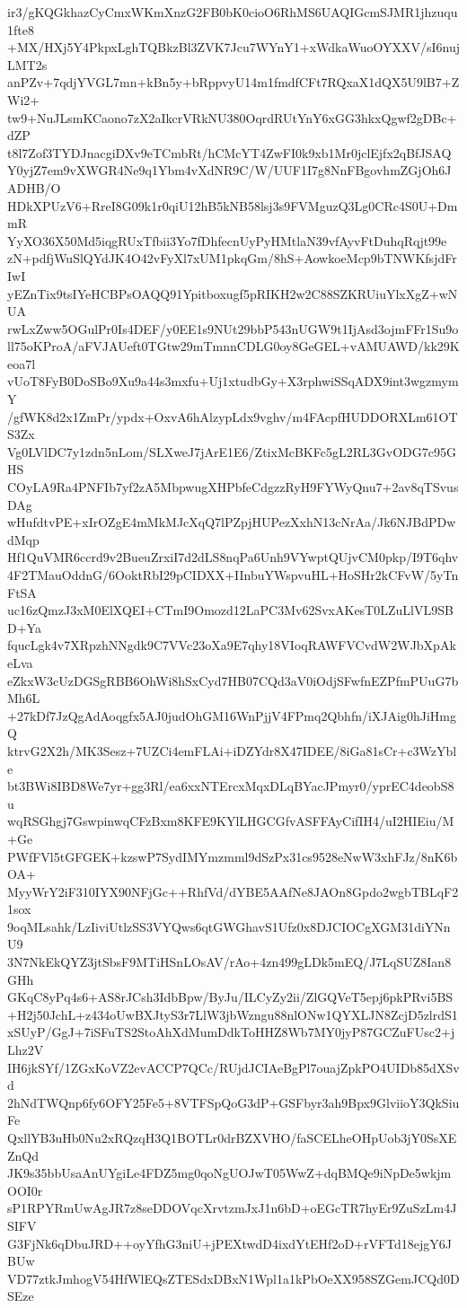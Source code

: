 ir3/gKQGkhazCyCmxWKmXnzG2FB0bK0cioO6RhMS6UAQIGcmSJMR1jhzuqu1fte8
+MX/HXj5Y4PkpxLghTQBkzBl3ZVK7Jcu7WYnY1+xWdkaWuoOYXXV/sI6nujLMT2s
anPZv+7qdjYVGL7mn+kBn5y+bRppvyU14m1fmdfCFt7RQxaX1dQX5U9lB7+ZWi2+
tw9+NuJLsmKCaono7zX2aIkcrVRkNU380OqrdRUtYnY6xGG3hkxQgwf2gDBc+dZP
t8l7Zof3TYDJnacgiDXv9eTCmbRt/hCMcYT4ZwFI0k9xb1Mr0jclEjfx2qBfJSAQ
Y0yjZ7em9vXWGR4Ne9q1Ybm4vXdNR9C/W/UUF1I7g8NnFBgovhmZGjOh6JADHB/O
HDkXPUzV6+RreI8G09k1r0qiU12hB5kNB58lsj3s9FVMguzQ3Lg0CRc4S0U+DmmR
YyXO36X50Md5iqgRUxTfbii3Yo7fDhfecnUyPyHMtlaN39vfAyvFtDuhqRqjt99e
zN+pdfjWuSlQYdJK4O42vFyXl7xUM1pkqGm/8hS+AowkoeMcp9bTNWKfsjdFrIwI
yEZnTix9tsIYeHCBPsOAQQ91Ypitboxugf5pRIKH2w2C88SZKRUiuYlxXgZ+wNUA
rwLxZww5OGulPr0Is4DEF/y0EE1s9NUt29bbP543nUGW9t1IjAsd3ojmFFr1Su9o
ll75oKProA/aFVJAUeft0TGtw29mTmnnCDLG0oy8GeGEL+vAMUAWD/kk29Keoa7l
vUoT8FyB0DoSBo9Xu9a44s3mxfu+Uj1xtudbGy+X3rphwiSSqADX9int3wgzmymY
/gfWK8d2x1ZmPr/ypdx+OxvA6hAlzypLdx9vghv/m4FAcpfHUDDORXLm61OTS3Zx
Vg0LVlDC7y1zdn5nLom/SLXweJ7jArE1E6/ZtixMcBKFc5gL2RL3GvODG7c95GHS
COyLA9Ra4PNFIb7yf2zA5MbpwugXHPbfeCdgzzRyH9FYWyQnu7+2av8qTSvusDAg
wHufdtvPE+xIrOZgE4mMkMJcXqQ7lPZpjHUPezXxhN13cNrAa/Jk6NJBdPDwdMqp
Hf1QuVMR6ccrd9v2BueuZrxiI7d2dLS8nqPa6Unh9VYwptQUjvCM0pkp/I9T6qhv
4F2TMauOddnG/6OoktRbI29pCIDXX+IInbuYWspvuHL+HoSHr2kCFvW/5yTnFtSA
uc16zQmzJ3xM0ElXQEI+CTmI9Omozd12LaPC3Mv62SvxAKesT0LZuLlVL9SBD+Ya
fqucLgk4v7XRpzhNNgdk9C7VVc23oXa9E7qhy18VIoqRAWFVCvdW2WJbXpAkeLva
eZkxW3cUzDGSgRBB6OhWi8hSxCyd7HB07CQd3aV0iOdjSFwfnEZPfmPUuG7bMh6L
+27kDf7JzQgAdAoqgfx5AJ0judOhGM16WnPjjV4FPmq2Qbhfn/iXJAig0hJiHmgQ
ktrvG2X2h/MK3Sesz+7UZCi4emFLAi+iDZYdr8X47IDEE/8iGa81sCr+c3WzYble
bt3BWi8IBD8We7yr+gg3Rl/ea6xxNTErcxMqxDLqBYacJPmyr0/yprEC4deobS8u
wqRSGhgj7GswpinwqCFzBxm8KFE9KYlLHGCGfvASFFAyCifIH4/uI2HIEiu/M+Ge
PWfFVl5tGFGEK+kzswP7SydIMYmzmml9dSzPx31cs9528eNwW3xhFJz/8nK6bOA+
MyyWrY2iF310IYX90NFjGc++RhfVd/dYBE5AAfNe8JAOn8Gpdo2wgbTBLqF21sox
9oqMLsahk/LzIiviUtlzSS3VYQws6qtGWGhavS1Ufz0x8DJCIOCgXGM31diYNnU9
3N7NkEkQYZ3jtSbsF9MTiHSnLOsAV/rAo+4zn499gLDk5mEQ/J7LqSUZ8Ian8GHh
GKqC8yPq4s6+AS8rJCsh3IdbBpw/ByJu/ILCyZy2ii/ZlGQVeT5epj6pkPRvi5BS
+H2j50JchL+z434oUwBXJtyS3r7LlW3jbWzngu88nlONw1QYXLJN8ZcjD5zlrdS1
xSUyP/GgJ+7iSFuTS2StoAhXdMumDdkToHHZ8Wb7MY0jyP87GCZuFUsc2+jLhz2V
IH6jkSYf/1ZGxKoVZ2evACCP7QCc/RUjdJCIAeBgPl7ouajZpkPO4UIDb85dXSvd
2hNdTWQnp6fy6OFY25Fe5+8VTFSpQoG3dP+GSFbyr3ah9Bpx9GlviioY3QkSiuFe
QxllYB3uHb0Nu2xRQzqH3Q1BOTLr0drBZXVHO/faSCELheOHpUob3jY0SsXEZnQd
JK9s35bbUsaAnUYgiLe4FDZ5mg0qoNgUOJwT05WwZ+dqBMQe9iNpDe5wkjmOOI0r
sP1RPYRmUwAgJR7z8seDDOVqcXrvtzmJxJ1n6bD+oEGcTR7hyEr9ZuSzLm4JSIFV
G3FjNk6qDbuJRD++oyYfhG3niU+jPEXtwdD4ixdYtEHf2oD+rVFTd18ejgY6JBUw
VD77ztkJmhogV54HfWlEQsZTESdxDBxN1Wpl1a1kPbOeXX958SZGemJCQd0DSEze
